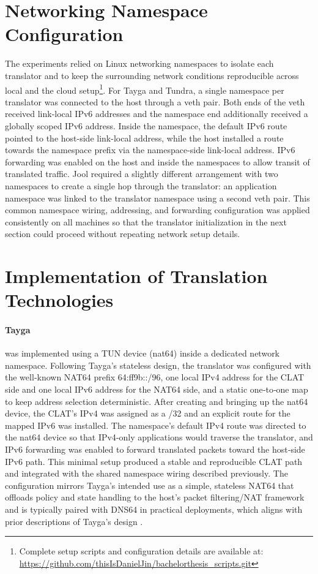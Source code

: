\section{Networking Namespace Configuration}
The experiments relied on Linux networking namespaces to isolate each translator and to keep the surrounding network conditions reproducible across local and the cloud setup\footnote{Complete setup scripts and configuration details are available at: \url{https://github.com/thisIsDanielJin/bachelorthesis_scripts.git}}. For Tayga and Tundra, a single namespace per translator was connected to the host through a veth pair\cite{veth4}. Both ends of the veth received link-local IPv6 addresses and the namespace end additionally received a globally scoped IPv6 address. Inside the namespace, the default IPv6 route pointed to the host-side link-local address, while the host installed a route towards the namespace prefix via the namespace-side link-local address. IPv6 forwarding was enabled on the host and inside the namespaces to allow transit of translated traffic. 
Jool required a slightly different arrangement with two namespaces to create a single hop through the translator: an application namespace was linked to the translator namespace using a second veth pair. This common namespace wiring, addressing, and forwarding configuration was applied consistently on all machines so that the translator initialization in the next section could proceed without repeating network setup details.




\section{Implementation of Translation Technologies}
\paragraph{Tayga}
was implemented using a TUN device (nat64) inside a dedicated network namespace. Following Tayga’s stateless design, the translator was configured with the well‑known NAT64 prefix 64:ff9b::/96, one local IPv4 address for the CLAT side and one local IPv6 address for the NAT64 side, and a static one‑to‑one map to keep address selection deterministic. After creating and bringing up the nat64 device, the CLAT’s IPv4 was assigned as a /32 and an explicit route for the mapped IPv6 was installed. The namespace’s default IPv4 route was directed to the nat64 device so that IPv4‑only applications would traverse the translator, and IPv6 forwarding was enabled to forward translated packets toward the host‑side IPv6 path. This minimal setup produced a stable and reproducible CLAT path and integrated with the shared namespace wiring described previously. The configuration mirrors Tayga’s intended use as a simple, stateless NAT64 that offloads policy and state handling to the host’s packet filtering/NAT framework and is typically paired with DNS64 in practical deployments, which aligns with prior descriptions of Tayga’s design \cite{Repas_Farnadi_Lencse_2014,palrd_tayga_readme}.

